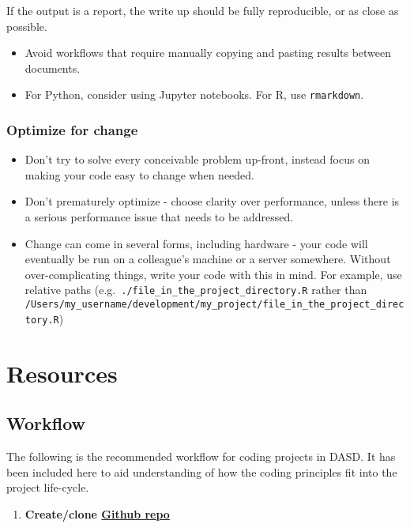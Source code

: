 \documentclass[]{book}
\providecommand{\tightlist}{%
  \setlength{\itemsep}{0pt}\setlength{\parskip}{0pt}}
\begin{document}
If the output is a report, the write up should be fully reproducible, or as close as possible.

\begin{itemize}
\tightlist
\item
  Avoid workflows that require manually copying and pasting results between documents.\\
\item
  For Python, consider using Jupyter notebooks. For R, use \texttt{rmarkdown}.
\end{itemize}

\hypertarget{change}{%
\section{Optimize for change}\label{change}}

\begin{itemize}
\tightlist
\item
  Don't try to solve every conceivable problem up-front, instead focus on making your code easy to change when needed.
\item
  Don't prematurely optimize - choose clarity over performance, unless there is a serious performance issue that needs to be addressed.
\item
  Change can come in several forms, including hardware - your code will eventually be run on a colleague's machine or a server somewhere. Without over-complicating things, write your code with this in mind. For example, use relative paths (e.g.~\texttt{./file\_in\_the\_project\_directory.R} rather than \texttt{/Users/my\_username/development/my\_project/file\_in\_the\_project\_directory.R})
\end{itemize}

\hypertarget{resources}{%
\part{Resources}\label{resources}}

\hypertarget{wf}{%
\chapter{Workflow}\label{wf}}

The following is the recommended workflow for coding projects in DASD. It has been included here to aid understanding of how the coding principles fit into the project life-cycle.

\begin{enumerate}
\def\labelenumi{\arabic{enumi}.}
\tightlist
\item
  \textbf{Create/clone \protect\hyperlink{versioncontrol}{Github repo}}\\
\end{enumerate}
\end{document}
